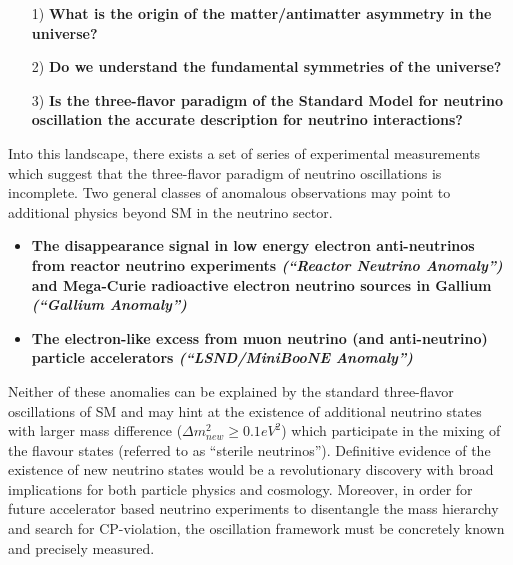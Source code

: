 \begin{itemize}[noitemsep,nolistsep]
\item[1)] \textbf{What is the origin of the matter/antimatter asymmetry in the universe?}

\item[2)] \textbf{Do we understand the fundamental symmetries of the universe?}

\item[3)] \textbf{Is the three-flavor paradigm of the Standard Model for neutrino oscillation the accurate description for neutrino interactions?}
\end{itemize}

\noindent Into this landscape, there exists a set of series of experimental measurements which suggest that the three-flavor paradigm of neutrino oscillations is incomplete. Two general classes of anomalous observations may point to additional physics beyond SM  in the neutrino sector.

\begin{itemize}[noitemsep,nolistsep]
\item \textbf{The disappearance signal in low energy electron anti-neutrinos from reactor neutrino experiments \cite{if:reactor} \textit{(``Reactor Neutrino Anomaly'')} and Mega-Curie radioactive electron neutrino sources in Gallium \cite{if:gallex, if:sage} \textit{(``Gallium Anomaly'')}}

\item \textbf{The electron-like excess from muon neutrino (and anti-neutrino) particle accelerators \textit{(``LSND/MiniBooNE Anomaly'')} \cite{if:lsnd, if:miniboone}}

\end{itemize}

Neither of these anomalies can be explained by the standard three-flavor oscillations of SM and may hint at the existence of additional neutrino states with larger mass difference ($\Delta m_{new}^{2}\geq 0.1 eV^{2}$) which participate in the mixing of the flavour states (referred to as ``sterile neutrinos''). Definitive evidence of the existence of new neutrino states would be a revolutionary discovery with broad implications for both particle physics and cosmology. Moreover, in order for future accelerator based neutrino experiments to disentangle the mass hierarchy and search for CP-violation, the oscillation framework must be concretely known and precisely measured.

